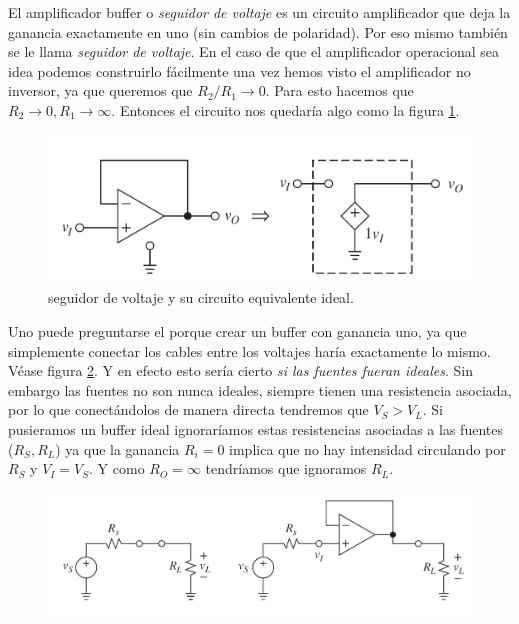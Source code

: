 \documentclass[12pt,a4paper]{article}
\numberwithin{equation}{section}
\numberwithin{figure}{section}
\begin{document}
El amplificador buffer o \textit{seguidor de voltaje} es un circuito amplificador que deja la ganancia exactamente en uno (sin cambios de polaridad). Por eso mismo también se le llama \textit{seguidor de voltaje}. En el caso de que el amplificador operacional sea idea podemos construirlo fácilmente una vez hemos visto el amplificador no inversor, ya que queremos que $R_2/R_1 \rightarrow 0$. Para esto hacemos que $R_2 \rightarrow 0, R_1 \rightarrow \infty$. Entonces el circuito nos quedaría algo como la figura \ref{Fig:1.3-Buffer}. \\



\begin{figure}[t] \centering
\includegraphics[scale=0.4]{1.3-Buffer.png}
\caption{seguidor de voltaje y su circuito equivalente ideal.}
\label{Fig:1.3-Buffer}
\end{figure} 

Uno puede preguntarse el porque crear un buffer con ganancia uno, ya que simplemente conectar los cables entre los voltajes haría exactamente lo mismo. Véase figura \ref{Fig:1.3-Buffer-1}. Y en efecto esto sería cierto \textit{si las fuentes fueran ideales}. Sin embargo las fuentes no son nunca ideales, siempre tienen una resistencia asociada, por lo que conectándolos de manera directa tendremos que $V_S > V_L$. Si pusieramos un buffer ideal ignoraríamos estas resistencias asociadas a las fuentes ($R_S,R_L$) ya que la ganancia $R_i = 0$ implica que no hay intensidad circulando por $R_S$ y $V_I = V_S$. Y como $R_O = \infty$ tendríamos que ignoramos $R_L$.  \\


\begin{figure}[t] \centering
\includegraphics[scale=0.4]{1.3-Buffer-1.png}
\caption{}
\label{Fig:1.3-Buffer-1}
\end{figure} 
\end{document}
